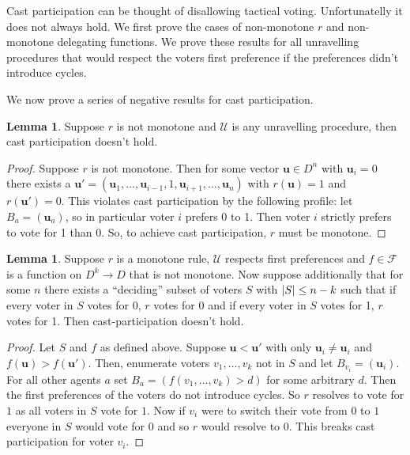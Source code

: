 \documentclass[11pt,a4paper, titlepage]{article}
\DeclarePairedDelimiter\abs{\lvert}{\rvert}
\theoremstyle{definition}
\newtheorem{lemma}[theorem]{Lemma}
\let\vec\mathbf
\begin{document}
Cast participation can be thought of disallowing tactical voting. Unfortunatelly it does not always hold. 
We first prove the cases of non-monotone $r$ and non-monotone delegating functions. 
We prove these results for all unravelling procedures that would respect the voters first preference if the preferences didn't introduce cycles.

We now prove a series of negative results for cast participation.

\begin{lemma} Suppose $r$ is not monotone and $\mathcal{U}$ is any unravelling procedure, then cast participation doesn't hold.
\end{lemma}

\begin{proof}
    Suppose $r$ is not monotone. Then for some vector $\vec{u} \in D^n$ with $\vec{u}_i = 0$ there exists a $\vec{u}' = (\vec{u}_1, \ldots, \vec{u}_{i-1}, 1, \vec{u}_{i+1}, \ldots, \vec{u}_n )$ with $r(\vec{u}) = 1$ and $r(\vec{u}') = 0$. This violates cast participation by the following profile: let $B_a = (\vec{u}_a)$, so in particular voter $i$ prefers 0 to 1. Then voter $i$ strictly prefers to vote for 1 than 0. So, to achieve cast participation, $r$ must be monotone. 
\end{proof}

\begin{lemma}
    Suppose $r$ is a monotone rule, $\mathcal{U}$ respects first preferences and $f \in \mathcal{F}$ is a function on $D^k \longrightarrow D$ that is not monotone. Now suppose additionally that for some $n$ there exists a ``deciding'' subset of voters $S$ with $\abs{S} \leq n - k$ such that if every voter in $S$ votes for 0, $r$ votes for 0 and if every voter in $S$ votes for 1, $r$ votes for 1. Then cast-participation doesn't hold.
\end{lemma}

\begin{proof}
    Let $S$ and $f$ as defined above. Suppose $\vec{u} < \vec{u}'$ with only $\vec{u}_i \neq \vec{u}_i$ and $f(\vec{u}) > f(\vec{u}')$. Then, enumerate voters $v_1, \ldots, v_k$ not in $S$ and let $B_{v_i} = (\vec{u}_i)$. For all other agents $a$ set $B_{a} = (f(v_1, \ldots, v_k) > d)$ for some arbitrary $d$. 
    Then the first preferences of the voters do not introduce cycles. So
     $r$ resolves to vote for $1$ as all voters in $S$ vote for $1$.
    Now if $v_i$ were to switch their vote from $0$ to $1$ everyone in $S$ would vote for $0$ and so $r$ would resolve to $0$. This breaks cast participation for voter $v_i$.
\end{proof}
\end{document}
